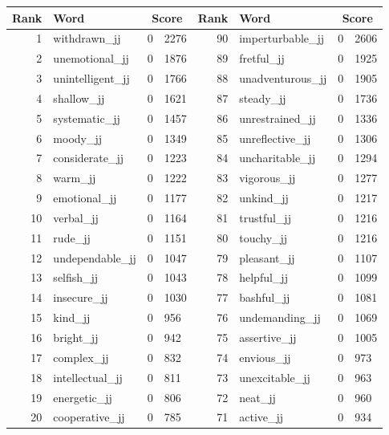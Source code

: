 \begin{table}[tbp]
    \begin{tabular}{| rlr@{.}l | rlr@{.}l |}
    \hline
    \textbf{Rank} & \textbf{Word} & \multicolumn{2}{c|}{\textbf{Score}} & \textbf{Rank} & \textbf{Word} & \multicolumn{2}{c|}{\textbf{Score}} \\
    \hline
    1 & withdrawn\_jj & 0 & 2276    &    90 & imperturbable\_jj & 0 & 2606 \\
    2 & unemotional\_jj & 0 & 1876    &    89 & fretful\_jj & 0 & 1925 \\
    3 & unintelligent\_jj & 0 & 1766    &    88 & unadventurous\_jj & 0 & 1905 \\
    4 & shallow\_jj & 0 & 1621    &    87 & steady\_jj & 0 & 1736 \\
    5 & systematic\_jj & 0 & 1457    &    86 & unrestrained\_jj & 0 & 1336 \\
    6 & moody\_jj & 0 & 1349    &    85 & unreflective\_jj & 0 & 1306 \\
    7 & considerate\_jj & 0 & 1223    &    84 & uncharitable\_jj & 0 & 1294 \\
    8 & warm\_jj & 0 & 1222    &    83 & vigorous\_jj & 0 & 1277 \\
    9 & emotional\_jj & 0 & 1177    &    82 & unkind\_jj & 0 & 1217 \\
    10 & verbal\_jj & 0 & 1164    &    81 & trustful\_jj & 0 & 1216 \\
    11 & rude\_jj & 0 & 1151    &    80 & touchy\_jj & 0 & 1216 \\
    12 & undependable\_jj & 0 & 1047    &    79 & pleasant\_jj & 0 & 1107 \\
    13 & selfish\_jj & 0 & 1043    &    78 & helpful\_jj & 0 & 1099 \\
    14 & insecure\_jj & 0 & 1030    &    77 & bashful\_jj & 0 & 1081 \\
    15 & kind\_jj & 0 & 956    &    76 & undemanding\_jj & 0 & 1069 \\
    16 & bright\_jj & 0 & 942    &    75 & assertive\_jj & 0 & 1005 \\
    17 & complex\_jj & 0 & 832    &    74 & envious\_jj & 0 & 973 \\
    18 & intellectual\_jj & 0 & 811    &    73 & unexcitable\_jj & 0 & 963 \\
    19 & energetic\_jj & 0 & 806    &    72 & neat\_jj & 0 & 960 \\
    20 & cooperative\_jj & 0 & 785    &    71 & active\_jj & 0 & 934 \\

\end{tabular}
\end{table}
